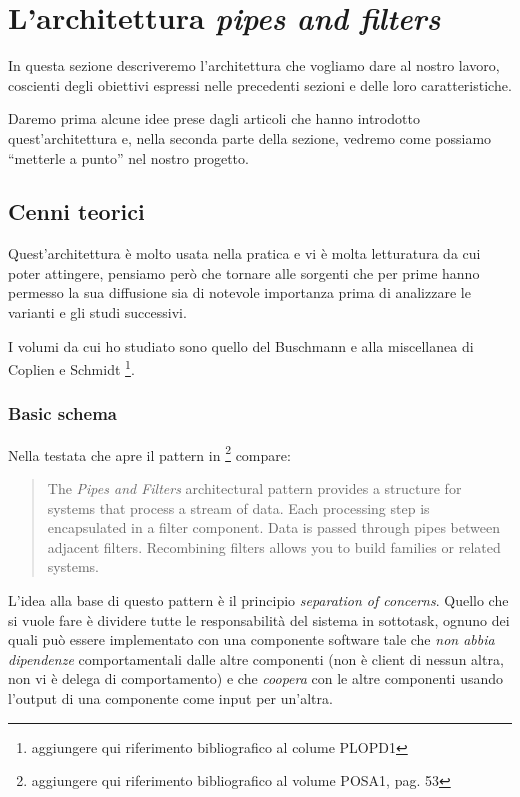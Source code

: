 \section{L'architettura \emph{pipes and filters}}

In questa sezione descriveremo l'architettura che vogliamo dare al
nostro lavoro, coscienti degli obiettivi espressi nelle precedenti
sezioni e delle loro caratteristiche.

Daremo prima alcune idee prese dagli articoli che hanno introdotto
quest'architettura e, nella seconda parte della sezione, vedremo come
possiamo ``metterle a punto'' nel nostro progetto.

\subsection{Cenni teorici}
Quest'architettura \`e molto usata nella pratica e vi \`e molta
letturatura da cui poter attingere, pensiamo per\`o che tornare alle
sorgenti che per prime hanno permesso la sua diffusione sia di
notevole importanza prima di analizzare le varianti e gli studi
successivi.

I volumi da cui ho studiato sono quello del Buschmann \cite{POSA} e
alla miscellanea di Coplien e Schmidt \footnote{aggiungere qui
  riferimento bibliografico al colume PLOPD1}.

\subsubsection{Basic schema}
Nella testata che apre il pattern in \footnote{aggiungere qui
  riferimento bibliografico al volume POSA1, pag. 53} compare:
\begin{quotation}
  The \emph{Pipes and Filters} architectural pattern provides a
  structure for systems that process a stream of data. Each processing
  step is encapsulated in a filter component. Data is passed through
  pipes between adjacent filters. Recombining filters allows you to
  build families or related systems.
\end{quotation}
L'idea alla base di questo pattern \`e il principio \emph{separation
  of concerns}. Quello che si vuole fare \`e dividere tutte le
responsabilit\`a del sistema in sottotask, ognuno dei quali pu\`o
essere implementato con una componente software tale che \emph{non
  abbia dipendenze} comportamentali dalle altre componenti (non \`e
client di nessun altra, non vi \`e delega di comportamento) e che
\emph{coopera} con le altre componenti usando l'output di una
componente come input per un'altra.

